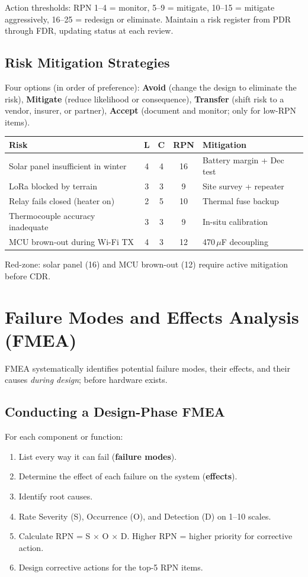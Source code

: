 \documentclass[11pt,letterpaper,twoside,openany]{book}
\begin{document}
Action thresholds: RPN 1--4 = monitor, 5--9 = mitigate, 10--15 = mitigate aggressively, 16--25 = redesign or eliminate. Maintain a risk register from PDR through FDR, updating status at each review.

\subsection{Risk Mitigation Strategies}
Four options (in order of preference): \textbf{Avoid} (change the design to eliminate the risk), \textbf{Mitigate} (reduce likelihood or consequence), \textbf{Transfer} (shift risk to a vendor, insurer, or partner), \textbf{Accept} (document and monitor; only for low-RPN items).


\begin{greenshieldbox}
\small
\begin{tabularx}{\textwidth}{X c c c X}
\toprule
\textbf{Risk} & \textbf{L} & \textbf{C} & \textbf{RPN} & \textbf{Mitigation} \\
\midrule
Solar panel insufficient in winter & 4 & 4 & 16 & Battery margin + Dec test \\
LoRa blocked by terrain & 3 & 3 & 9 & Site survey + repeater \\
Relay fails closed (heater on) & 2 & 5 & 10 & Thermal fuse backup \\
Thermocouple accuracy inadequate & 3 & 3 & 9 & In-situ calibration \\
MCU brown-out during Wi-Fi TX & 4 & 3 & 12 & 470\,$\mu$F decoupling \\
\bottomrule
\end{tabularx}
Red-zone: solar panel (16) and MCU brown-out (12) require active mitigation before CDR.
\end{greenshieldbox}

\section{Failure Modes and Effects Analysis (FMEA)}
FMEA systematically identifies potential failure modes, their effects, and their causes \emph{during design}; before hardware exists.

\subsection{Conducting a Design-Phase FMEA}
For each component or function:
\begin{enumerate}[nosep,leftmargin=1.5em]
\item List every way it can fail (\textbf{failure modes}).
\item Determine the effect of each failure on the system (\textbf{effects}).
\item Identify root causes.
\item Rate Severity (S), Occurrence (O), and Detection (D) on 1--10 scales.
\item Calculate RPN = S $\times$ O $\times$ D. Higher RPN = higher priority for corrective action.
\item Design corrective actions for the top-5 RPN items.
\end{enumerate}
\end{document}
